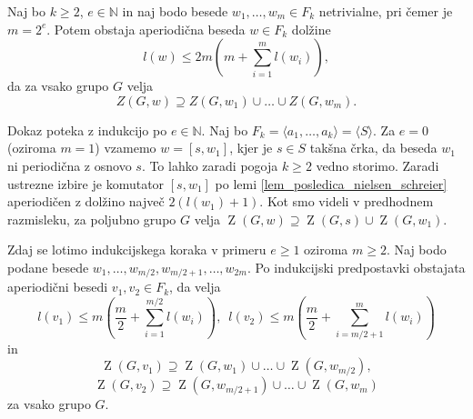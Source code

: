 \begin{lema}
    \label{lem_komutatorska_lema}
     Naj bo $k \ge 2$, $e \in  \mathbb{N}$ in naj bodo besede $w_1, \ldots, w_m \in F_k$ netrivialne, pri čemer je $m = 2^{e}$. Potem obstaja aperiodična beseda $w \in F_k$
     dolžine \begin{equation*}
     l(w) \le 2m \left(m + \sum_{i=1}^{m} l(w_{i}) \right),
     \end{equation*}  
    da za vsako grupo $G$ velja \begin{equation*}
    Z(G, w) \supseteq Z(G, w_1) \cup \ldots \cup Z(G, w_m).
    \end{equation*}       
\end{lema}
    \begin{dokaz}
        Dokaz poteka z indukcijo po $e \in  \mathbb{N}$. Naj bo $F_k = \langle a_1, \ldots , a_{k} \rangle = \langle S \rangle$.  Za $e = 0$ (oziroma $m = 1$) vzamemo $w = [s, w_1]$, kjer je $s \in S$ takšna črka, da beseda $w_1$ ni periodična z osnovo $s$. 
        To lahko zaradi pogoja $k \ge 2$ vedno storimo. Zaradi ustrezne izbire je komutator $[s, w_1]$ po lemi \ref{lem_posledica_nielsen_schreier} aperiodičen z dolžino največ $2(l(w_1)  + 1)$.
        Kot smo videli v predhodnem razmisleku, za poljubno grupo $G$ velja $\operatorname{Z}(G, w) \supseteq \operatorname{Z}(G, s) \cup \operatorname{Z}(G, w_1)$.
        
        Zdaj se lotimo indukcijskega koraka v primeru $e \ge 1$ oziroma $m \ge 2$. Naj bodo podane besede $w_1, \ldots, w_{m / 2}, w_{m / 2 + 1}, \ldots, w_{2m}$. Po indukcijski predpostavki obstajata aperiodični besedi $v_1, v_2 \in  F_{k}$,  da velja
        \begin{equation*}
        l(v_1) \le m \left(\frac{m}{2} + \sum_{i=1}^{m / 2} l(w_{i}) \right), \,\,\, l(v_2) \le m \left(\frac{m}{2} + \sum_{i= m / 2 + 1}^{m} l(w_{i}) \right)
        \end{equation*}  
        in \begin{equation*}
        \operatorname{Z}(G, v_1) \supseteq \operatorname{Z}(G, w_1) \cup \ldots \cup \operatorname{Z}(G, w_{m / 2}),
        \end{equation*}  
        \begin{equation*}
            \operatorname{Z}(G, v_2) \supseteq \operatorname{Z}(G, w_{m / 2 + 1}) \cup \ldots \cup \operatorname{Z}(G, w_{m})
        \end{equation*}  
        za vsako grupo $G$.


\end{dokaz}
